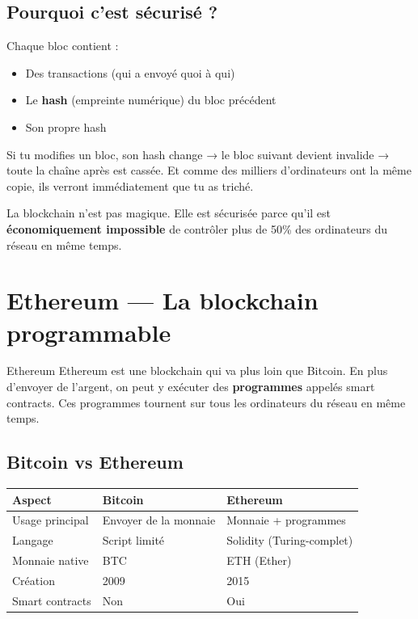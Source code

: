 \documentclass[12pt, a4paper]{article}
\begin{document}
\subsection{Pourquoi c'est sécurisé ?}

Chaque bloc contient :
\begin{itemize}
  \item Des transactions (qui a envoyé quoi à qui)
  \item Le \textbf{hash} (empreinte numérique) du bloc précédent
  \item Son propre hash
\end{itemize}

Si tu modifies un bloc, son hash change → le bloc suivant devient invalide → toute la chaîne
après est cassée. Et comme des milliers d'ordinateurs ont la même copie, ils verront
immédiatement que tu as triché.

\begin{attention}
La blockchain n'est pas magique. Elle est sécurisée parce qu'il est \textbf{économiquement
impossible} de contrôler plus de 50\% des ordinateurs du réseau en même temps.
\end{attention}

\section{Ethereum --- La blockchain programmable}

\begin{definition}{Ethereum}
Ethereum est une blockchain qui va plus loin que Bitcoin. En plus d'envoyer de l'argent,
on peut y exécuter des \textbf{programmes} appelés smart contracts. Ces programmes
tournent sur tous les ordinateurs du réseau en même temps.
\end{definition}

\subsection{Bitcoin vs Ethereum}

\begin{center}
\renewcommand{\arraystretch}{1.4}
\begin{tabular}{lll}
  \toprule
  \textbf{Aspect} & \textbf{Bitcoin} & \textbf{Ethereum} \\
  \midrule
  Usage principal & Envoyer de la monnaie & Monnaie + programmes \\
  Langage & Script limité & Solidity (Turing-complet) \\
  Monnaie native & BTC & ETH (Ether) \\
  Création & 2009 & 2015 \\
  Smart contracts & Non & Oui \\
  \bottomrule
\end{tabular}
\end{center}
\end{document}
